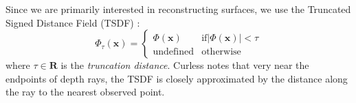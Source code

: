 \documentclass[conference]{IEEEtran}
\newcommand{\eref}[1]{(\ref{#1})}
\newcommand{\figref}[1]{Fig.\ref{#1}}
\begin{document}
Since we are primarily interested in reconstructing surfaces,
we use the Truncated Signed Distance Field (TSDF) \cite{Curless1996}:
\begin{equation}
	\Phi_{\tau}(\mathbf{x}) =
	\begin{cases}
		\Phi(\mathbf{x}) &  \text{if} |\Phi(\mathbf{x})| < \tau \\
		\text{undefined} & \text{otherwise}
	\end{cases}
\end{equation}
where $\tau \in \mathbf{R}$ is the \emph{truncation distance}.  Curless
\cite{Curless1996} notes that very near the endpoints of depth rays, the TSDF is
closely approximated by the distance along the ray to the nearest observed
point.   
 
% 
% 
% 
\end{document}
